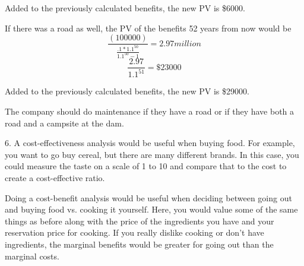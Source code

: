 \documentclass{article}
\begin{document}
Added to the previously calculated benefits, the new PV is \$6000.

If there was a road as well, the PV of the benefits 52 years from now would be 
$$\frac{(100000)}{\frac{.1*1.1^{50}}{1.1^{50}-1}}=2.97 million$$
$$\frac{2.97}{1.1^{51}}=\$23000$$

Added to the previously calculated benefits, the new PV is \$29000.

The company should do maintenance if they have a road or if they have both a road and a campsite at the dam.

6.	A cost-effectiveness analysis would be useful when buying food. For example, you want to go buy cereal, but there are many different brands. In this case, you could measure the taste on a scale of 1 to 10 and compare that to the cost to create a cost-effective ratio. 

Doing a cost-benefit analysis would be useful when deciding between going out and buying food vs. cooking it yourself. Here, you would value some of the same things as before along with the price of the ingredients you have and your reservation price for cooking. If you really dislike cooking or don't have ingredients, the marginal benefits would be greater for going out than the marginal costs.
\end{document}
